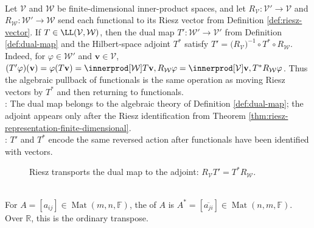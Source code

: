 \begin{perspective} \label{per:hilbert-adjoint-riesz-dual-map} \\
Let $\mathcal{V}$ and $\mathcal{W}$ be finite-dimensional inner-product spaces, and let $R_{\mathcal{V}}:\mathcal{V}'\to\mathcal{V}$ and $R_{\mathcal{W}}:\mathcal{W}'\to\mathcal{W}$ send each functional to its Riesz vector from Definition \ref{def:riesz-vector}. If $T\in\LL(\mathcal{V},\mathcal{W})$, then the dual map $T':\mathcal{W}'\to\mathcal{V}'$ from Definition \ref{def:dual-map} and the Hilbert-space adjoint $T^*$ satisfy $T'=\bigl(R_{\mathcal{V}}\bigr)^{-1}\circ T^*\circ R_{\mathcal{W}}$.\\
Indeed, for $\varphi\in\mathcal{W}'$ and $\mathbf{v}\in\mathcal{V}$, $(T'\varphi)(\mathbf{v})=\varphi(T\mathbf{v}) =\innerprod[\mathcal{W}]{T\mathbf{v},R_{\mathcal{W}}\varphi} =\innerprod[\mathcal{V}]{\mathbf{v},T^*R_{\mathcal{W}}\varphi}$. Thus the algebraic pullback of functionals is the same operation as moving Riesz vectors by $T^*$ and then returning to functionals.\\
: The dual map belongs to the algebraic theory of Definition \ref{def:dual-map}; the adjoint appears only after the Riesz identification from Theorem \ref{thm:riesz-representation-finite-dimensional}.\\
: $T'$ and $T^*$ encode the same reversed action after functionals have been identified with vectors.
\end{perspective}

\begin{figure}[H]
  \centering
  
  \caption{Riesz transports the dual map to the adjoint: $R_{\mathcal{V}}T'=T^*R_{\mathcal{W}}$.}
  \label{fig:riesz-dual-hilbert-adjoint-square}
\end{figure}

\begin{definition} \label{def:conjugate-transpose} \\
For $A=[a_{ij}]\in\operatorname{Mat}(m,n,\mathbb{F})$, the  of $A$ is $A^*=[\overline{a_{ji}}]\in\operatorname{Mat}(n,m,\mathbb{F})$.\\
Over $\mathbb{R}$, this is the ordinary transpose.
\end{definition}

